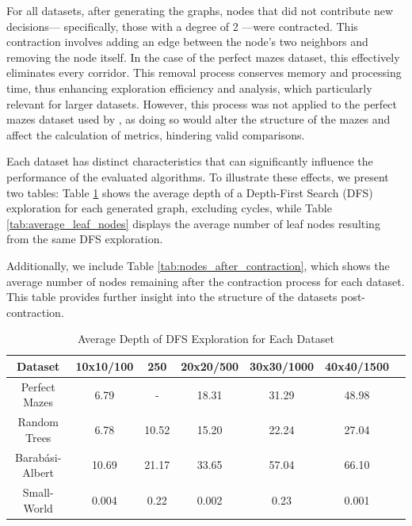 For all datasets, after generating the graphs, nodes that did not contribute new decisions— specifically, those with a degree of 2 —were contracted. This contraction involves adding an edge between the node's two neighbors and removing the node itself. In the case of the perfect mazes dataset, this effectively eliminates every corridor. This removal process conserves memory and processing time, thus enhancing exploration efficiency and analysis, which particularly relevant for larger datasets. However, this process was not applied to the perfect mazes dataset used by , as doing so would alter the structure of the mazes and affect the calculation of metrics, hindering valid comparisons.

Each dataset has distinct characteristics that can significantly influence the performance of the evaluated algorithms. To illustrate these effects, we present two tables: Table \ref{tab:average_depth} shows the average depth of a Depth-First Search (DFS) exploration for each generated graph, excluding cycles, while Table \ref{tab:average_leaf_nodes} displays the average number of leaf nodes resulting from the same DFS exploration.

Additionally, we include Table \ref{tab:nodes_after_contraction}, which shows the average number of nodes remaining after the contraction process for each dataset. This table provides further insight into the structure of the datasets post-contraction.

\begin{table}[H]
    \centering
    \caption{Average Depth of DFS Exploration for Each Dataset}
    \label{tab:average_depth}
    \begin{tabular}{|c|c|c|c|c|c|c|} 
        \hline
        \textbf{Dataset} & \textbf{10x10/100} & \textbf{250} & \textbf{20x20/500} & \textbf{30x30/1000} & \textbf{40x40/1500} \\ 
        \hline
        Perfect Mazes & 6.79 & - & 18.31 & 31.29 & 48.98 \\ 
        \hline
        Random Trees & 6.78 & 10.52 & 15.20 & 22.24 & 27.04 \\ 
        \hline
        Barabási-Albert & 10.69 & 21.17 & 33.65 & 57.04 & 66.10 \\ 
        \hline
        Small-World & 0.004 & 0.22 & 0.002 & 0.23 & 0.001
        \\
        \hline
    \end{tabular}
\end{table}


